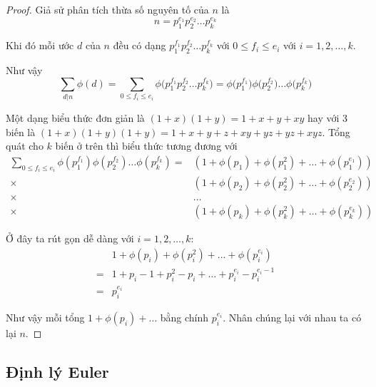 \documentclass{mynotes}
\begin{document}
\begin{proof}
    Giả sử phân tích thừa số nguyên tố của $n$ là 
    \begin{equation*}
        n = p_1^{e_1} p_2^{e_2} \ldots p_k^{e_k}
    \end{equation*}

    Khi đó mỗi ước $d$ của $n$ đều có dạng $p_1^{f_1} p_2^{f_2} \ldots p_k^{f_k}$ với $0 \leqslant f_i \leqslant e_i$ với $i = 1, 2, \ldots, k$.

    Như vậy
    \begin{equation*}
        \sum_{d | n} \phi(d) = \sum_{0 \leqslant f_i \leqslant e_i} \phi\Big(p_1^{f_1} p_2^{f_2} \ldots p_k^{f_k}\Big)
                            = \phi\Big(p_1^{f_1}\Big) \phi\Big(p_2^{f_2}\Big) \ldots \phi\Big(p_k^{f_k}\Big)
    \end{equation*}

    Một dạng biểu thức đơn giản là $(1+x)(1+y) = 1+x+y+xy$ hay với 3 biến là $(1+x)(1+y)(1+y) = 1 + x + y + z + xy + yz + yz + xyz$. Tổng quát cho $k$ biến ở trên thì biểu thức tương đương với
    \begin{align*}
        \sum_{0 \leqslant f_i \leqslant e_i} \phi(p_1^{f_1}) \phi(p_2^{f_2}) \ldots
        \phi(p_k^{f_k}) = & (1 + \phi(p_1) + \phi(p_1^2) + \ldots + \phi(p_1^{e_1})) \\
        \times & (1 + \phi(p_2) + \phi(p_2^2) + \ldots + \phi(p_2^{e_2})) \\
        \times & \ldots \\
        \times & (1 + \phi(p_k) + \phi(p_k^2) + \ldots + \phi(p_k^{e_k}))
    \end{align*}

    Ở đây ta rút gọn dễ dàng với $i = 1, 2, \ldots, k$:
    \begin{align*}
        & 1 + \phi(p_i) + \phi(p_i^2) + \ldots + \phi(p_i^{e_i}) \\
        = & 1 + p_i - 1 + p_i^2 - p_i + \ldots + p_i^{e_i} - p_i^{e_i-1} \\
        = & p_i^{e_i}
    \end{align*}

    Như vậy mỗi tổng $1 + \phi(p_i) + \ldots$ bằng chính $p_i^{e_i}$. Nhân chúng lại với nhau ta có lại $n$.
\end{proof}

\subsection*{Định lý Euler}
\end{document}
